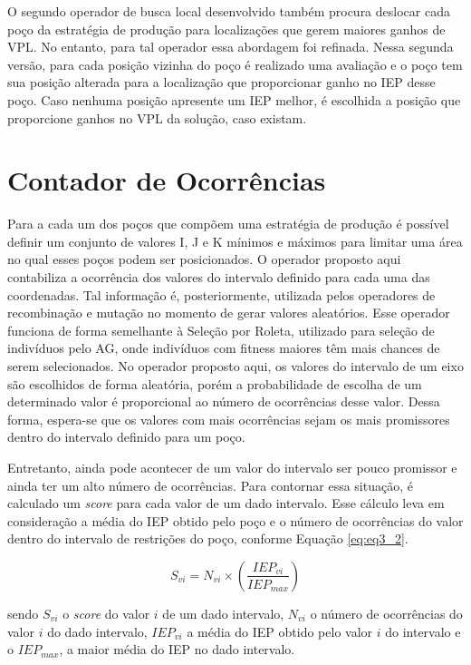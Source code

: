 O segundo operador de busca local desenvolvido também procura deslocar cada poço da estratégia de produção para localizações que gerem maiores ganhos de VPL. No entanto, para tal operador essa abordagem foi refinada. Nessa segunda versão, para cada posição vizinha do poço é realizado uma avaliação e o poço tem sua posição alterada para a localização que proporcionar ganho no IEP desse poço. Caso nenhuma posição apresente um IEP melhor, é escolhida a posição que proporcione ganhos no VPL da solução, caso existam. 

\section{Contador de Ocorrências}
\label{sec:3_ContadorOcorrencias}  
Para a cada um dos poços que compõem uma estratégia de produção é possível definir um conjunto de valores I, J e K mínimos e máximos para limitar uma área no qual esses poços podem ser posicionados. O operador proposto aqui contabiliza a ocorrência dos valores do intervalo definido para cada uma das coordenadas. Tal informação é, posteriormente, utilizada pelos operadores de recombinação e mutação no momento de gerar valores aleatórios. Esse operador funciona de forma semelhante à Seleção por Roleta, utilizado para seleção de indivíduos pelo AG, onde indivíduos com fitness maiores têm mais chances de serem selecionados. No operador proposto aqui, os valores do intervalo de um eixo são escolhidos de forma aleatória, porém a probabilidade de escolha de um determinado valor é proporcional ao número de ocorrências desse valor. Dessa forma, espera-se que os valores com mais ocorrências sejam os mais promissores dentro do intervalo definido para um poço.

Entretanto, ainda pode acontecer de um valor do intervalo ser pouco promissor e ainda ter um alto número de ocorrências. Para contornar essa situação, é calculado um \textit{score} para cada valor de um dado intervalo. Esse cálculo leva em consideração a média do IEP obtido pelo poço e o número de ocorrências do valor dentro do intervalo de restrições do poço, conforme Equação \ref{eq:eq3_2}.

\begin{equation}
  \label{eq:eq3_2}
  S_{vi} = N_{vi} \times (\frac{IEP_{vi}}{IEP_{max}})
\end{equation}
  
sendo $S_{vi}$ o \textit{score} do valor $i$ de um dado intervalo, $N_{vi}$ o número de ocorrências do valor $i$ do dado intervalo, $IEP_{vi}$ a média do IEP obtido pelo valor $i$ do intervalo e o $IEP_{max}$, a maior média do IEP no dado intervalo. 

